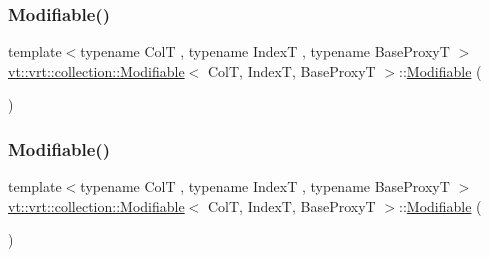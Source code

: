 \subsubsection{\texorpdfstring{Modifiable()}{Modifiable()}\hspace{0.1cm}{\footnotesize\ttfamily [1/4]}}
{\footnotesize\ttfamily template$<$typename ColT , typename IndexT , typename Base\+ProxyT $>$ \\
\hyperlink{structvt_1_1vrt_1_1collection_1_1_modifiable}{vt\+::vrt\+::collection\+::\+Modifiable}$<$ ColT, IndexT, Base\+ProxyT $>$\+::\hyperlink{structvt_1_1vrt_1_1collection_1_1_modifiable}{Modifiable} (\begin{DoxyParamCaption}{ }\end{DoxyParamCaption})\hspace{0.3cm}{\ttfamily [default]}}

\mbox{\label{structvt_1_1vrt_1_1collection_1_1_modifiable_a783537b097c2f010ee4d9bfa74153f60}} 
\subsubsection{\texorpdfstring{Modifiable()}{Modifiable()}\hspace{0.1cm}{\footnotesize\ttfamily [2/4]}}
{\footnotesize\ttfamily template$<$typename ColT , typename IndexT , typename Base\+ProxyT $>$ \\
\hyperlink{structvt_1_1vrt_1_1collection_1_1_modifiable}{vt\+::vrt\+::collection\+::\+Modifiable}$<$ ColT, IndexT, Base\+ProxyT $>$\+::\hyperlink{structvt_1_1vrt_1_1collection_1_1_modifiable}{Modifiable} (\begin{DoxyParamCaption}\item[{\hyperlink{structvt_1_1vrt_1_1collection_1_1_modifiable}{Modifiable}$<$ ColT, IndexT, Base\+ProxyT $>$ const \&}]{ }\end{DoxyParamCaption})\hspace{0.3cm}{\ttfamily [default]}}

\mbox{\label{structvt_1_1vrt_1_1collection_1_1_modifiable_a56475c70666566d7455bdc20d239cf6f}} 
